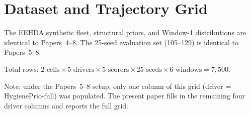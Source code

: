 \section{Dataset and Trajectory Grid}

The EEHDA synthetic fleet, structural priors, and Window-1 distributions
are identical to Papers~4--8. The 25-seed evaluation set (105--129) is
identical to Papers~5--8.



Total rows: $2 \text{ cells} \times 5 \text{ drivers} \times 5
\text{ scorers} \times 25 \text{ seeds} \times 6 \text{ windows} =
7{,}500$.

Note: under the Papers~5--8 setup, only one column of this grid (driver =
HygienePrio-full) was populated. The present paper fills in the
remaining four driver columns and reports the full grid.
